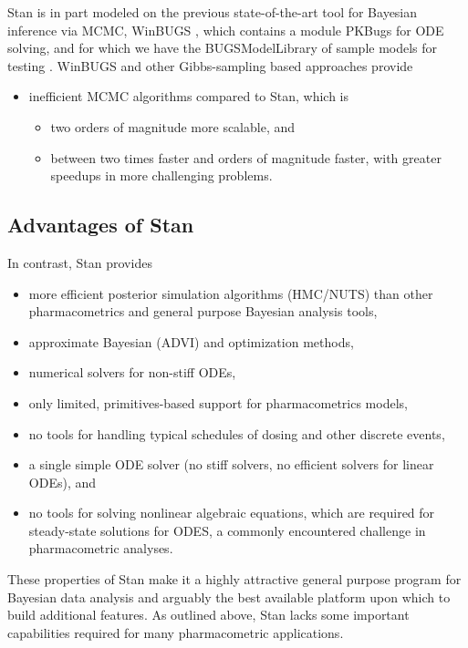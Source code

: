 \documentclass[11pt]{nih2016}
\begin{document}
Stan is in part modeled on the previous state-of-the-art tool for
Bayesian inference via MCMC, WinBUGS \cite{lunn-et-al:2000}, which
contains a module PKBugs for ODE solving, and for which we have the
BUGSModelLibrary of sample models for testing
\cite{gastonguay-et-al:2010}.  WinBUGS and other Gibbs-sampling based
approaches provide

\begin{itemize}
\item inefficient MCMC algorithms compared to Stan, which is
\begin{itemize}
\item  two orders of magnitude more scalable, and
\item  between two times faster and orders of magnitude faster,
  with greater speedups in more challenging problems.
\end{itemize}
\end{itemize}

\subsection{Advantages of Stan}

In contrast, Stan provides

\begin{itemize}
\item more efficient posterior simulation algorithms (HMC/NUTS) than
  other pharmacometrics and general purpose Bayesian analysis tools,
\item approximate Bayesian (ADVI) and optimization methods,
\item numerical solvers for non-stiff ODEs,
\item only limited, primitives-based support for pharmacometrics models,
\item no tools for handling typical schedules of dosing and other discrete events,
\item a single simple ODE solver (no stiff solvers, no efficient
  solvers for linear ODEs), and
\item no tools for solving nonlinear algebraic equations, which are
  required for steady-state solutions for ODES, a commonly encountered
  challenge in pharmacometric analyses.
\end{itemize}

These properties of Stan make it a highly attractive general purpose
program for Bayesian data analysis and arguably the best available
platform upon which to build additional features. As outlined above,
Stan lacks some important capabilities required for many
pharmacometric applications.
\end{document}
